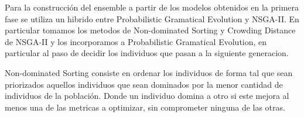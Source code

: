 Para la construcción del ensemble a partir de los modelos obtenidos en la primera fase se utiliza un
hibrido entre Probabilistic Gramatical Evolution y NSGA-II. En particular tomamos los metodos de
Non-dominated Sorting y Crowding Distance de NSGA-II y los incorporamos a Probabilistic Gramatical
Evolution, en particular al paso de decidir los individuos que pasan a la siguiente generacion.

Non-dominated Sorting consiste en ordenar los individuos de forma tal que sean priorizados aquellos
individuos que sean dominados por la menor cantidad de individuos de la población. Donde un individuo
domina a otro si este mejora al menos una de las metricas a optimizar, sin comprometer ninguna de las
otras.
